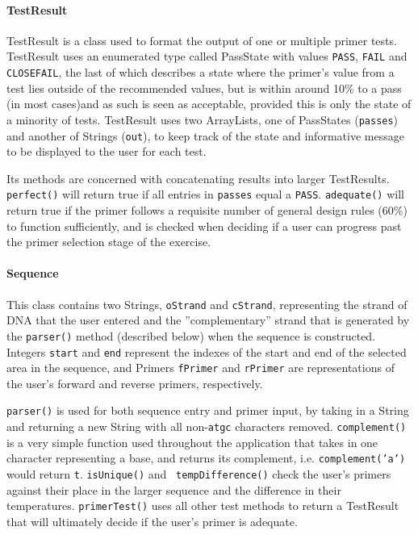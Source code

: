\paragraph{TestResult}
TestResult is a class used to format the output of one or multiple primer 
tests. TestResult uses an enumerated type called PassState with values
\texttt{PASS}, \texttt{FAIL} and \texttt{CLOSEFAIL}, the last of which describes 
a state where the primer's value from a test lies outside of the recommended
values, but is within around 10\% to a pass (in most cases)and as such is seen as
acceptable, provided this is 
only the state of a minority of tests. TestResult uses two ArrayLists, one of
PassStates (\texttt{passes}) and another of Strings (\texttt{out}), to keep track 
of the state and informative message to be displayed to the user for each 
test. 

Its methods are concerned with concatenating results into larger 
TestResults. \texttt{perfect()} will return true if all entries in 
\texttt{passes} equal a \texttt{PASS}. \texttt{adequate()} will return true if the
primer follows a requisite number of general design rules (60\%) to function 
sufficiently, and is checked when deciding if a user can progress past the
primer selection stage of the exercise.
 
\paragraph{Sequence}
This class contains two Strings, \texttt{oStrand} and \texttt{cStrand}, 
representing the strand of DNA that the user entered and the ''complementary''
strand that is generated by the \texttt{parser()} method (described below)
when the sequence is constructed. Integers \texttt{start} and \texttt{end} represent 
the indexes of the start and end of the selected area in the sequence, and Primers 
\texttt{fPrimer} and \texttt{rPrimer} are representations of the user's forward
and reverse primers, respectively.
 
\texttt{parser()} is used for both sequence entry and primer input, by taking in
a String and returning a new String with all non-\texttt{atgc} characters removed.
\texttt{complement()} is a very simple function used throughout the application
that takes in one character representing a base, and returns its complement, i.e.
\texttt{complement('a')} would return \texttt{t}. \texttt{isUnique()} and \texttt{
tempDifference()} check the user's primers against their place in the larger sequence
and the difference in their temperatures. \texttt{primerTest()} uses all other test 
methods to return a TestResult that will ultimately decide if the user's primer is
adequate.  																										%
